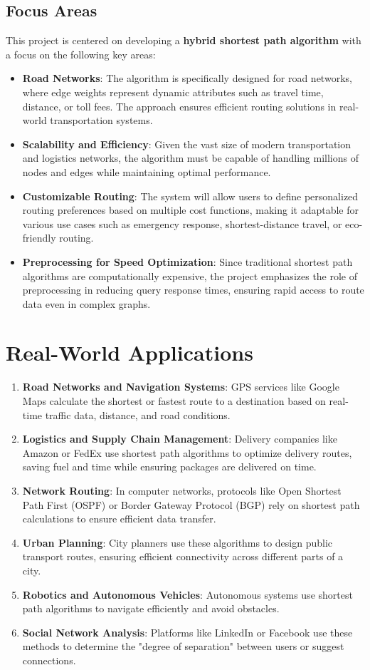 	\subsection{Focus Areas}
	This project is centered on developing a \textbf{hybrid shortest path algorithm} with a focus on the following key areas:
	\begin{itemize}
		\item \textbf{Road Networks}: The algorithm is specifically designed for road networks, where edge weights represent dynamic attributes such as travel time, distance, or toll fees. The approach ensures efficient routing solutions in real-world transportation systems.
		\item \textbf{Scalability and Efficiency}: Given the vast size of modern transportation and logistics networks, the algorithm must be capable of handling millions of nodes and edges while maintaining optimal performance.
		\item \textbf{Customizable Routing}: The system will allow users to define personalized routing preferences based on multiple cost functions, making it adaptable for various use cases such as emergency response, shortest-distance travel, or eco-friendly routing.
		\item \textbf{Preprocessing for Speed Optimization}: Since traditional shortest path algorithms are computationally expensive, the project emphasizes the role of preprocessing in reducing query response times, ensuring rapid access to route data even in complex graphs.
	\end{itemize}
	\section{Real-World Applications}

\begin{enumerate}
	\item \textbf{Road Networks and Navigation Systems}: GPS services like Google Maps calculate the shortest or fastest route to a destination based on real-time traffic data, distance, and road conditions.
	\item \textbf{Logistics and Supply Chain Management}: Delivery companies like Amazon or FedEx use shortest path algorithms to optimize delivery routes, saving fuel and time while ensuring packages are delivered on time.
	\item \textbf{Network Routing}: In computer networks, protocols like Open Shortest Path First (OSPF) or Border Gateway Protocol (BGP) rely on shortest path calculations to ensure efficient data transfer.
	\item \textbf{Urban Planning}: City planners use these algorithms to design public transport routes, ensuring efficient connectivity across different parts of a city.
	\item \textbf{Robotics and Autonomous Vehicles}: Autonomous systems use shortest path algorithms to navigate efficiently and avoid obstacles.
	\item \textbf{Social Network Analysis}: Platforms like LinkedIn or Facebook use these methods to determine the "degree of separation" between users or suggest connections.
\end{enumerate}


